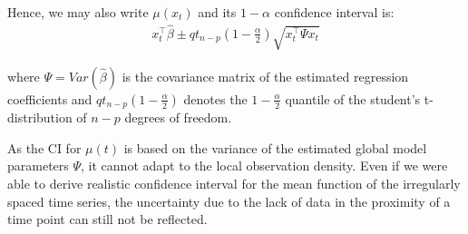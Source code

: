 Hence, we may also write $\mu(x_t)$ and its $1-\alpha$ confidence interval is:
\begin{gather*}
    x_{t}^{\top} \hat{\beta} \pm qt_{n-p}(1-\frac{\alpha}{2})  \sqrt{x_t^{\top} \Psi x_t}
\end{gather*}

where $\Psi = Var(\hat{\beta})$ is the covariance matrix of the estimated regression coefficients
and $qt_{n-p}(1-\frac{\alpha}{2})$ denotes the $1-\frac{\alpha}{2}$ quantile of the student's t-distribution of
$n-p$ degrees of freedom.

As the CI for $\mu(t)$ is based on the variance of the estimated global model parameters $\Psi$,
it cannot adapt to the local observation density.
Even if we were able to derive realistic confidence interval for the mean function of the irregularly spaced
time series, the uncertainty due to the lack of data in the proximity of a time point can still not be reflected.


